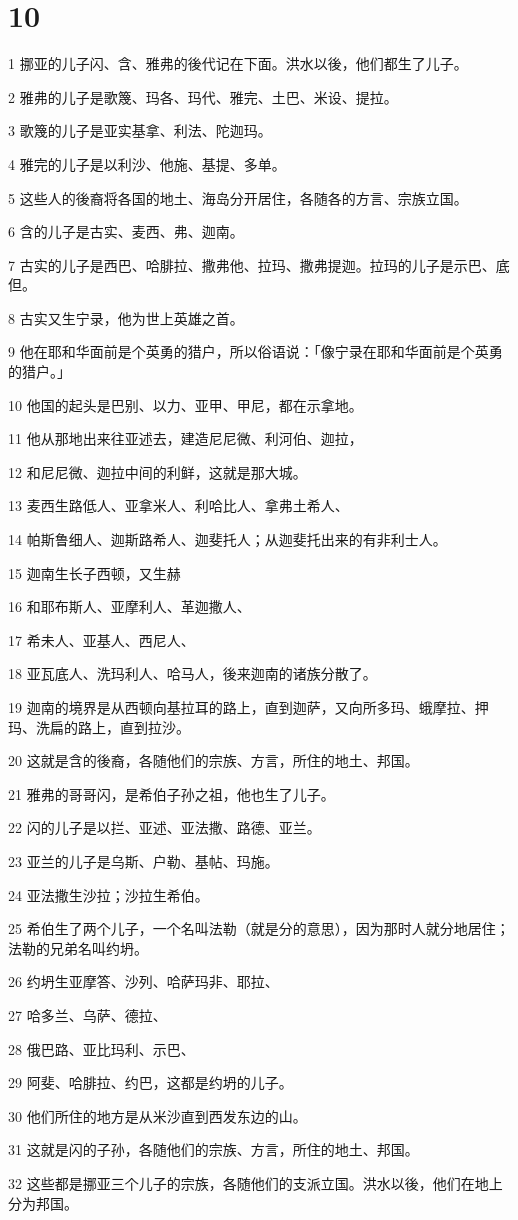 \chapter{10}

\par 1 挪亚的儿子闪、含、雅弗的後代记在下面。洪水以後，他们都生了儿子。
\par 2 雅弗的儿子是歌篾、玛各、玛代、雅完、土巴、米设、提拉。
\par 3 歌篾的儿子是亚实基拿、利法、陀迦玛。
\par 4 雅完的儿子是以利沙、他施、基提、多单。
\par 5 这些人的後裔将各国的地土、海岛分开居住，各随各的方言、宗族立国。
\par 6 含的儿子是古实、麦西、弗、迦南。
\par 7 古实的儿子是西巴、哈腓拉、撒弗他、拉玛、撒弗提迦。拉玛的儿子是示巴、底但。
\par 8 古实又生宁录，他为世上英雄之首。
\par 9 他在耶和华面前是个英勇的猎户，所以俗语说：「像宁录在耶和华面前是个英勇的猎户。」
\par 10 他国的起头是巴别、以力、亚甲、甲尼，都在示拿地。
\par 11 他从那地出来往亚述去，建造尼尼微、利河伯、迦拉，
\par 12 和尼尼微、迦拉中间的利鲜，这就是那大城。
\par 13 麦西生路低人、亚拿米人、利哈比人、拿弗土希人、
\par 14 帕斯鲁细人、迦斯路希人、迦斐托人；从迦斐托出来的有非利士人。
\par 15 迦南生长子西顿，又生赫
\par 16 和耶布斯人、亚摩利人、革迦撒人、
\par 17 希未人、亚基人、西尼人、
\par 18 亚瓦底人、洗玛利人、哈马人，後来迦南的诸族分散了。
\par 19 迦南的境界是从西顿向基拉耳的路上，直到迦萨，又向所多玛、蛾摩拉、押玛、洗扁的路上，直到拉沙。
\par 20 这就是含的後裔，各随他们的宗族、方言，所住的地土、邦国。
\par 21 雅弗的哥哥闪，是希伯子孙之祖，他也生了儿子。
\par 22 闪的儿子是以拦、亚述、亚法撒、路德、亚兰。
\par 23 亚兰的儿子是乌斯、户勒、基帖、玛施。
\par 24 亚法撒生沙拉；沙拉生希伯。
\par 25 希伯生了两个儿子，一个名叫法勒（就是分的意思），因为那时人就分地居住；法勒的兄弟名叫约坍。
\par 26 约坍生亚摩答、沙列、哈萨玛非、耶拉、
\par 27 哈多兰、乌萨、德拉、
\par 28 俄巴路、亚比玛利、示巴、
\par 29 阿斐、哈腓拉、约巴，这都是约坍的儿子。
\par 30 他们所住的地方是从米沙直到西发东边的山。
\par 31 这就是闪的子孙，各随他们的宗族、方言，所住的地土、邦国。
\par 32 这些都是挪亚三个儿子的宗族，各随他们的支派立国。洪水以後，他们在地上分为邦国。

